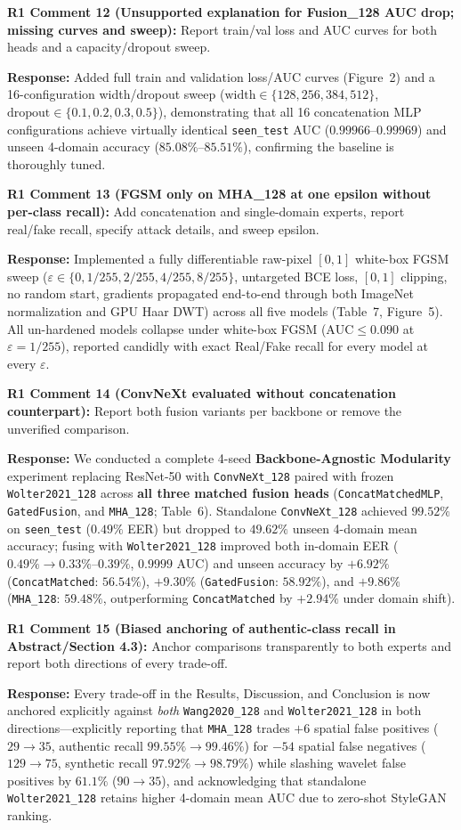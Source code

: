\documentclass[11pt,a4paper]{article}
\newcommand{\reviewercomment}[2]{%
  \vspace{0.6em}\noindent\begin{tcolorbox}[colback=boxbg,colframe=revcolor,boxrule=0.6pt,left=6pt,right=6pt,top=4pt,bottom=4pt]
  \textbf{\color{revcolor}#1:} #2
  \end{tcolorbox}
}
\newcommand{\authorresponse}[1]{%
  \noindent\textbf{\color{respcolor}Response:} #1\par\vspace{0.5em}
}
\begin{document}
\reviewercomment{R1 Comment 12 (Unsupported explanation for Fusion\_128 AUC drop; missing curves and sweep)}{Report train/val loss and AUC curves for both heads and a capacity/dropout sweep.}
\authorresponse{Added full train and validation loss/AUC curves (Figure~2) and a 16-configuration width/dropout sweep ($\text{width}\in\{128,256,384,512\}$, $\text{dropout}\in\{0.1,0.2,0.3,0.5\}$), demonstrating that all 16 concatenation MLP configurations achieve virtually identical \texttt{seen\_test} AUC ($0.99966$--$0.99969$) and unseen 4-domain accuracy ($85.08\%$--$85.51\%$), confirming the baseline is thoroughly tuned.}

\reviewercomment{R1 Comment 13 (FGSM only on MHA\_128 at one epsilon without per-class recall)}{Add concatenation and single-domain experts, report real/fake recall, specify attack details, and sweep epsilon.}
\authorresponse{Implemented a fully differentiable raw-pixel $[0,1]$ white-box FGSM sweep ($\varepsilon \in \{0,\allowbreak 1/255,\allowbreak 2/255,\allowbreak 4/255,\allowbreak 8/255\}$, untargeted BCE loss, $[0,1]$ clipping, no random start, gradients propagated end-to-end through both ImageNet normalization and GPU Haar DWT) across all five models (Table~7, Figure~5). All un-hardened models collapse under white-box FGSM ($\text{AUC}\le 0.090$ at $\varepsilon=1/255$), reported candidly with exact Real/Fake recall for every model at every $\varepsilon$.}

\reviewercomment{R1 Comment 14 (ConvNeXt evaluated without concatenation counterpart)}{Report both fusion variants per backbone or remove the unverified comparison.}
\authorresponse{We conducted a complete 4-seed \textbf{Backbone-Agnostic Modularity} experiment replacing ResNet-50 with \texttt{ConvNeXt\_128} paired with frozen \texttt{Wolter2021\_128} across \textbf{all three matched fusion heads} (\texttt{ConcatMatchedMLP}, \texttt{GatedFusion}, and \texttt{MHA\_128}; Table~6). Standalone \texttt{ConvNeXt\_128} achieved $99.52\%$ on \texttt{seen\_test} ($0.49\%$ EER) but dropped to $49.62\%$ unseen 4-domain mean accuracy; fusing with \texttt{Wolter2021\_128} improved both in-domain EER ($0.49\% \to 0.33\%$--$0.39\%$, $0.9999$ AUC) and unseen accuracy by $+6.92\%$ (\texttt{ConcatMatched}: $56.54\%$), $+9.30\%$ (\texttt{GatedFusion}: $58.92\%$), and $+9.86\%$ (\texttt{MHA\_128}: $59.48\%$, outperforming \texttt{ConcatMatched} by $+2.94\%$ under domain shift).}

\reviewercomment{R1 Comment 15 (Biased anchoring of authentic-class recall in Abstract/Section 4.3)}{Anchor comparisons transparently to both experts and report both directions of every trade-off.}
\authorresponse{Every trade-off in the Results, Discussion, and Conclusion is now anchored explicitly against \emph{both} \texttt{Wang2020\_128} and \texttt{Wolter2021\_128} in both directions---explicitly reporting that \texttt{MHA\_128} trades $+6$ spatial false positives ($29 \to 35$, authentic recall $99.55\% \to 99.46\%$) for $-54$ spatial false negatives ($129 \to 75$, synthetic recall $97.92\% \to 98.79\%$) while slashing wavelet false positives by $61.1\%$ ($90 \to 35$), and acknowledging that standalone \texttt{Wolter2021\_128} retains higher 4-domain mean AUC due to zero-shot StyleGAN ranking.}
\end{document}
